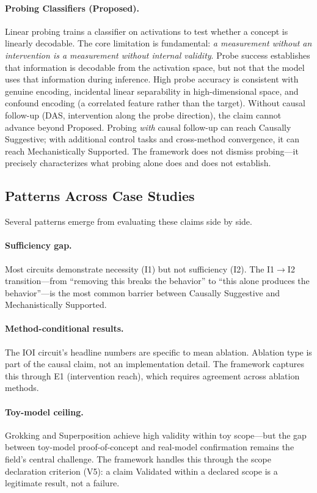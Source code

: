 \documentclass[10pt]{article}
\begin{document}
\paragraph{Probing Classifiers (Proposed).} Linear probing \citep{belinkov2022probing} trains a classifier on activations to test whether a concept is linearly decodable. The core limitation is fundamental: \emph{a measurement without an intervention is a measurement without internal validity}. Probe success establishes that information is decodable from the activation space, but not that the model uses that information during inference. High probe accuracy is consistent with genuine encoding, incidental linear separability in high-dimensional space, and confound encoding (a correlated feature rather than the target). Without causal follow-up (DAS, intervention along the probe direction), the claim cannot advance beyond Proposed. Probing \emph{with} causal follow-up can reach Causally Suggestive; with additional control tasks and cross-method convergence, it can reach Mechanistically Supported. The framework does not dismiss probing---it precisely characterizes what probing alone does and does not establish.

\subsection{Patterns Across Case Studies}

Several patterns emerge from evaluating these claims side by side.

\paragraph{Sufficiency gap.} Most circuits demonstrate necessity (I1) but not sufficiency (I2). The I1$\rightarrow$I2 transition---from ``removing this breaks the behavior'' to ``this alone produces the behavior''---is the most common barrier between Causally Suggestive and Mechanistically Supported.

\paragraph{Method-conditional results.} The IOI circuit's headline numbers are specific to mean ablation. Ablation type is part of the causal claim, not an implementation detail. The framework captures this through E1 (intervention reach), which requires agreement across ablation methods.

\paragraph{Toy-model ceiling.} Grokking and Superposition achieve high validity within toy scope---but the gap between toy-model proof-of-concept and real-model confirmation remains the field's central challenge. The framework handles this through the scope declaration criterion (V5): a claim Validated within a declared scope is a legitimate result, not a failure.
\end{document}
